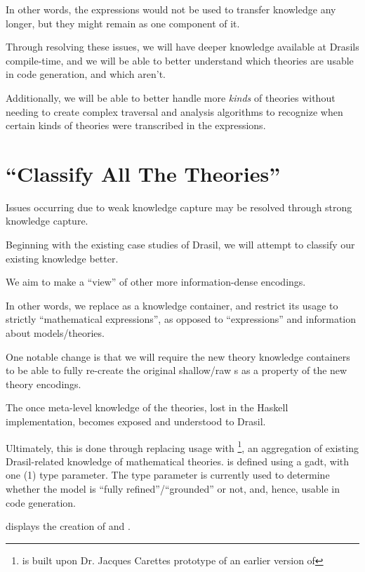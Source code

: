 In other words, the expressions would not be used to transfer knowledge any
longer, but they might remain as one component of it.

Through resolving these issues, we will have deeper knowledge available at
Drasils compile-time, and we will be able to better understand which theories
are usable in code generation, and which aren't.

Additionally, we will be able to better handle more \textit{kinds} of theories
without needing to create complex traversal and analysis algorithms to recognize
when certain kinds of theories were transcribed in the expressions.




\section{\textquotedblleft{}Classify All The Theories\textquotedblright{}}

Issues occurring due to weak knowledge capture may be resolved through strong
knowledge capture.

Beginning with the existing case studies of Drasil, we will attempt to classify
our existing knowledge better.

We aim to make \RelationConcept{} a ``view'' of other more information-dense
encodings.

In other words, we replace \Expr{} as a knowledge container, and restrict its
usage to strictly ``mathematical expressions'', as opposed to ``expressions''
and information about models/theories.

One notable change is that we will require the new theory knowledge containers
to be able to fully re-create the original shallow/raw \Expr{}s as a property of
the new theory encodings.

The once meta-level knowledge of the theories, lost in the Haskell
implementation, becomes exposed and understood to Drasil.

Ultimately, this is done through replacing \RelationConcept{} usage with
\ModelKind{}\footnote{\ModelKind{} is built upon Dr. Jacques Carettes prototype
of an earlier version of \ModelKinds{}}, an aggregation of existing
Drasil-related knowledge of mathematical theories. \ModelKind{} is defined using
a \acs{gadt}, with one (1) type parameter. The type parameter is currently used
to determine whether the model is ``fully refined''/``grounded'' or not, and,
hence, usable in code generation.

 displays the creation of \ModelKind{} and
\ModelKinds{}.

